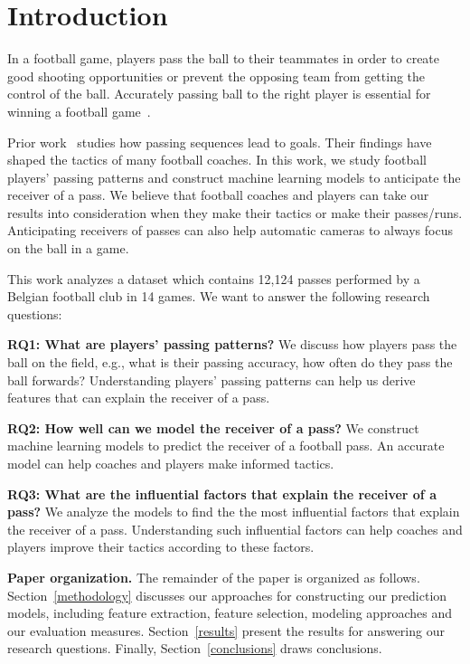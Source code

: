 \section{Introduction} \label{intro}
In a football game, players pass the ball to their teammates in order to create good shooting opportunities or prevent the opposing team from getting the control of the ball.
Accurately passing ball to the right player is essential for winning a football game~\cite{Ali2011Measuring,Hughes2005Analysis}.

Prior work~\cite{reep1968skill,Hughes2005Analysis} studies how passing sequences lead to goals. Their findings have shaped the tactics of many football coaches.
In this work, we study football players' passing patterns and construct machine learning models to anticipate the receiver of a pass.
We believe that football coaches and players can take our results into consideration when they make their tactics or make their passes/runs. 
Anticipating receivers of passes can also help automatic cameras to always focus on the ball in a game.

This work analyzes a dataset which contains 12,124 passes performed by a Belgian football club in 14 games. We want to answer the following research questions: 

\begin{description}
	\item \textbf{RQ1: What are players' passing patterns?}
	We discuss how players pass the ball on the field, e.g., what is their passing accuracy, how often do they pass the ball forwards?
	Understanding players' passing patterns can help us derive features that can explain the receiver of a pass. 
	
	\item \textbf{RQ2: How well can we model the receiver of a pass?}
	We construct machine learning models to predict the receiver of a football pass. 
	An accurate model can help coaches and players make informed tactics.
	
	\item \textbf{RQ3: What are the influential factors that explain the receiver of a pass?}
	We analyze the models to find the the most influential factors that explain the receiver of a pass. Understanding such influential factors can help coaches and players improve their tactics according to these factors.
\end{description}

\textbf{Paper organization.}
The remainder of the paper is organized as follows.
Section~\ref{methodology} discusses our approaches for constructing our prediction models, including feature extraction, feature selection, modeling approaches and our evaluation measures.
Section~\ref{results} present the results for answering our research questions.
Finally, Section~\ref{conclusions} draws conclusions.

